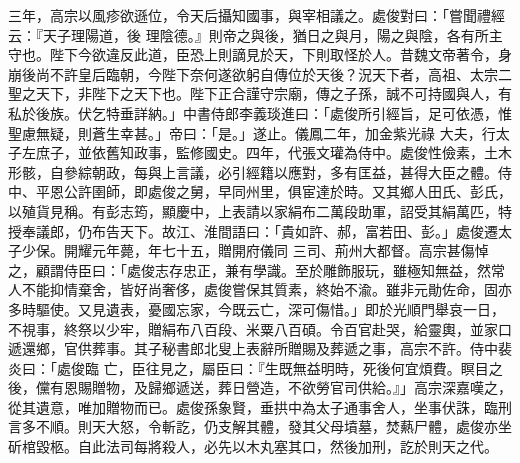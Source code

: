 \begin{pinyinscope}
 三年，高宗以風疹欲遜位，令天后攝知國事，與宰相議之。處俊對曰：「嘗聞禮經云：『天子理陽道，後
 理陰德。』則帝之與後，猶日之與月，陽之與陰，各有所主守也。陛下今欲違反此道，臣恐上則謫見於天，下則取怪於人。昔魏文帝著令，身崩後尚不許皇后臨朝，今陛下奈何遂欲躬自傳位於天後？況天下者，高祖、太宗二聖之天下，非陛下之天下也。陛下正合謹守宗廟，傳之子孫，誠不可持國與人，有私於後族。伏乞特垂詳納。」中書侍郎李義琰進曰：「處俊所引經旨，足可依憑，惟聖慮無疑，則蒼生幸甚。」帝曰：「是。」遂止。儀鳳二年，加金紫光祿
 大夫，行太子左庶子，並依舊知政事，監修國史。四年，代張文瓘為侍中。處俊性儉素，土木形骸，自參綜朝政，每與上言議，必引經籍以應對，多有匡益，甚得大臣之體。侍中、平恩公許圉師，即處俊之舅，早同州里，俱宦達於時。又其鄉人田氏、彭氏，以殖貨見稱。有彭志筠，顯慶中，上表請以家絹布二萬段助軍，詔受其絹萬匹，特授奉議郎，仍布告天下。故江、淮間語曰：「貴如許、郝，富若田、彭。」處俊遷太子少保。開耀元年薨，年七十五，贈開府儀同
 三司、荊州大都督。高宗甚傷悼之，顧謂侍臣曰：「處俊志存忠正，兼有學識。至於雕飾服玩，雖極知無益，然常人不能抑情棄舍，皆好尚奢侈，處俊嘗保其質素，終始不渝。雖非元勛佐命，固亦多時驅使。又見遺表，憂國忘家，今既云亡，深可傷惜。」即於光順門舉哀一日，不視事，終祭以少牢，贈絹布八百段、米粟八百碩。令百官赴哭，給靈輿，並家口遞還鄉，官供葬事。其子秘書郎北叟上表辭所贈賜及葬遞之事，高宗不許。侍中裴炎曰：「處俊臨
 亡，臣往見之，屬臣曰：『生既無益明時，死後何宜煩費。瞑目之後，儻有恩賜贈物，及歸鄉遞送，葬日營造，不欲勞官司供給。』」高宗深嘉嘆之，從其遺意，唯加贈物而已。處俊孫象賢，垂拱中為太子通事舍人，坐事伏誅，臨刑言多不順。則天大怒，令斬訖，仍支解其體，發其父母墳墓，焚爇尸體，處俊亦坐斫棺毀柩。自此法司每將殺人，必先以木丸塞其口，然後加刑，訖於則天之代。




\end{pinyinscope}
